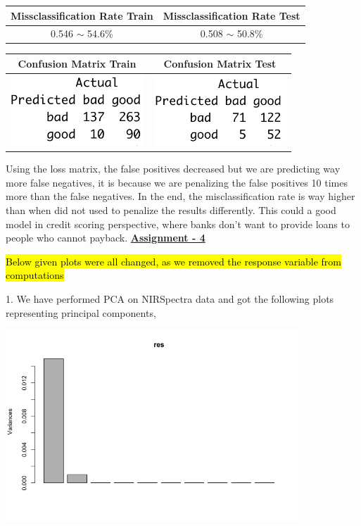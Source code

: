 \documentclass[a4paper,10pt]{article}
\begin{document}
\begin{center}
  \begin{tabular}{|c|c|}
    \hline
    \textbf{Missclassification Rate Train} & \textbf{Missclassification Rate Test}\\
    \hline
    0.546 $\sim$ 54.6\% & 0.508 $\sim$ 50.8\%\\
    \hline
  \end{tabular}
  \par
  \begin{tabular}{|c|c|}
    \hline
    \textbf{Confusion Matrix Train} & \textbf{Confusion Matrix Test}\\
    \hline
    \includegraphics[width=50mm,scale=0.10]{Bayes_Loss_Matrix_Train_CM.png} & \includegraphics[width=50mm,scale=0.10]{Bayes_Loss_Matrix_Test_CM.png} \\
    \hline
  \end{tabular}
\end{center} \par
Using the loss matrix, the false positives decreased but we are predicting way more false negatives, it is because we are penalizing the false positives 10 times more than the false negatives.
In the end, the misclassification rate is way higher than when did not used to penalize the results differently. This could a good model in credit scoring 
perspective, where banks don't want to provide loans to people who cannot payback. 
\newpage
\textbf{\underline{Assignment - 4}} \par
\hl{Below given plots were all changed, as we removed the response variable from computations} \par
1. We have performed PCA on NIRSpectra data and got the following plots representing principal components, \par
\begin{center}
  \includegraphics[width=110mm,scale=0.10]{PCA_Variance_Plot.png} 
\end{center}
\end{document}
